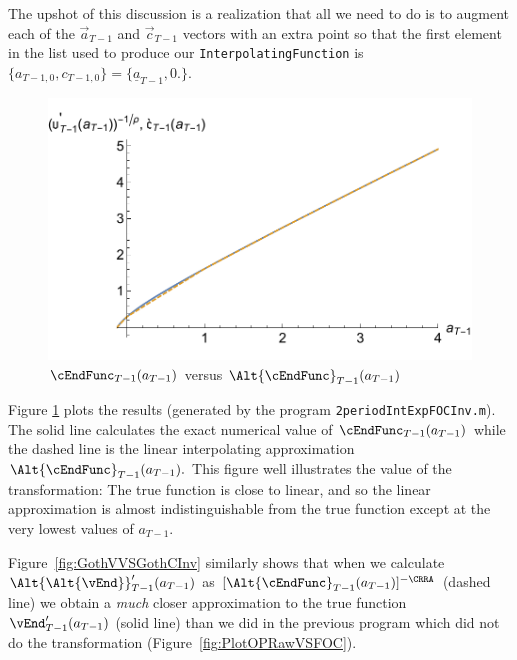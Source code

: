 \documentclass[titlepage]{\econtex}
\begin{document}
The upshot of this discussion is a realization that all we need to do is to
augment each of the $\vec{a}_{T-1}$ and $\vec{c}_{T-1}$ vectors with an extra point so that the
first element in the list used to produce our \texttt{InterpolatingFunction} is
$\{{a}_{T-1,0},{c}_{T-1,0}\}=\{\underline{a}_{T-1},0.\}$.

\hypertarget{GothVInvVSGothC}{}
\begin{figure}
  \includegraphics{./Figures/GothVInvVSGothC}
  \caption{$\cEndFunc_{T-1}({a}_{T-1})$ versus $\Alt{\cEndFunc}_{T-1}({a}_{T-1})$}
  \label{fig:GothVInvVSGothC}
\end{figure}



Figure
\ref{fig:GothVInvVSGothC} plots the results (generated by the program
\texttt{2periodIntExpFOCInv.m}).
The solid line calculates the exact
numerical value of $\cEndFunc_{T-1}({a}_{T-1})$ while the dashed
line is the linear interpolating approximation
$\Alt{\cEndFunc}_{T-1}({a}_{T-1}).$ This figure well illustrates the
value of the transformation: The
true function is close to linear,
and so the linear approximation is almost indistinguishable from the
true function except at the very lowest values of ${a}_{T-1}$.

Figure~\ref{fig:GothVVSGothCInv} similarly shows that when we calculate
$\Alt{\Alt{\vEnd}}_{T-1}^{\prime}({a}_{T-1})$ as
$[\Alt{\cEndFunc}_{T-1}({a}_{T-1})]^{-\CRRA}$ (dashed line) we
obtain a \textit{much} closer approximation to the true function
$\vEnd_{T-1}^{\prime}({a}_{T-1})$ (solid line) than we did in
the previous  program which did not do the
transformation (Figure~\ref{fig:PlotOPRawVSFOC}).
\end{document}
